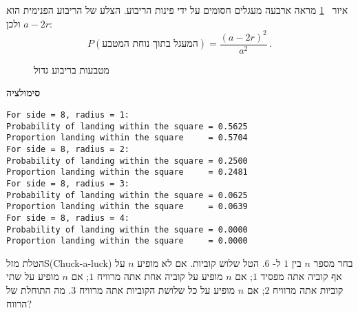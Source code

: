 איור%
~\ref{f.coins2}
מראה ארבעה מעגלים חסומים על ידי פינות הריבוע. הצלע של הריבוע הפנימית הוא 
$a-2r$
ולכן:
\[
P(\textrm{המעגל בתוך נוחת המטבע})=\frac{(a-2r)^2}{a^2}\,.
\]
\begin{figure}[tb]
\begin{center}
\end{center}
\caption{מטבעות בריבוע גדול}\label{f.coins2}
\end{figure}

\textbf{סימולציה}
\begin{verbatim}
For side = 8, radius = 1:
Probability of landing within the square = 0.5625
Proportion landing within the square     = 0.5704
For side = 8, radius = 2:
Probability of landing within the square = 0.2500
Proportion landing within the square     = 0.2481
For side = 8, radius = 3:
Probability of landing within the square = 0.0625
Proportion landing within the square     = 0.0639
For side = 8, radius = 4:
Probability of landing within the square = 0.0000
Proportion landing within the square     = 0.0000
\end{verbatim}


\begin{prob}{הטלת מזל}{S}{(Chuck-a-luck)}
בחר מספר 
$n$
בין 
$1$
ל-%
$6$.
הטל שלוש קוביות. אם לא מופיע
$n$
על אף קוביה אתה מפסיד
$1$;
אם 
$n$
מופיע על קוביה אחת אתה מרוויח
$1$;
אם 
$n$
מופיע על שתי קוביות אתה מרוויח
$2$;
אם 
$n$
מופיע על כל שלושת הקוביות אתה מרוויח 
$3$.
מה התוחלת של הרווח?
\end{prob}

